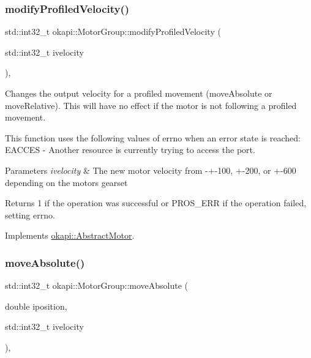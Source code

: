 \subsubsection{\texorpdfstring{modifyProfiledVelocity()}{modifyProfiledVelocity()}}
{\footnotesize\ttfamily std\+::int32\+\_\+t okapi\+::\+Motor\+Group\+::modify\+Profiled\+Velocity (\begin{DoxyParamCaption}\item[{std\+::int32\+\_\+t}]{ivelocity }\end{DoxyParamCaption})\hspace{0.3cm}{\ttfamily [override]}, {\ttfamily [virtual]}}

Changes the output velocity for a profiled movement (move\+Absolute or move\+Relative). This will have no effect if the motor is not following a profiled movement.

This function uses the following values of errno when an error state is reached\+: E\+A\+C\+C\+ES -\/ Another resource is currently trying to access the port.


\begin{DoxyParams}{Parameters}
{\em ivelocity} & The new motor velocity from -\/+-\/100, +-\/200, or +-\/600 depending on the motor\textquotesingle{}s gearset \\
\hline
\end{DoxyParams}
\begin{DoxyReturn}{Returns}
1 if the operation was successful or P\+R\+O\+S\+\_\+\+E\+RR if the operation failed, setting errno. 
\end{DoxyReturn}


Implements \mbox{\hyperlink{classokapi_1_1AbstractMotor_a1d131cbf0b8a325a54034e540c3be6d2}{okapi\+::\+Abstract\+Motor}}.

\mbox{\label{classokapi_1_1MotorGroup_afe6800639a995d37d8963c72fb8526d4}} 
\subsubsection{\texorpdfstring{moveAbsolute()}{moveAbsolute()}}
{\footnotesize\ttfamily std\+::int32\+\_\+t okapi\+::\+Motor\+Group\+::move\+Absolute (\begin{DoxyParamCaption}\item[{double}]{iposition,  }\item[{std\+::int32\+\_\+t}]{ivelocity }\end{DoxyParamCaption})\hspace{0.3cm}{\ttfamily [override]}, {\ttfamily [virtual]}}

